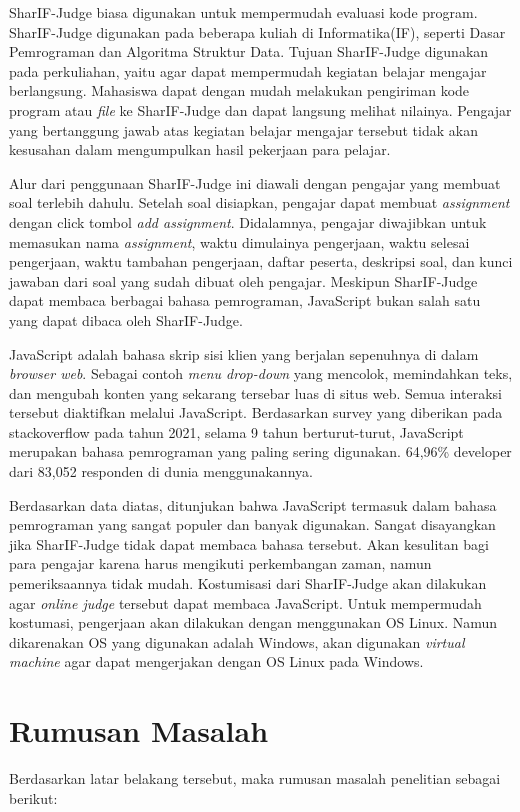 \documentclass[a4paper,twoside]{article}
\begin{document}
SharIF-Judge biasa digunakan untuk mempermudah evaluasi kode program.  SharIF-Judge digunakan pada beberapa kuliah di Informatika(IF), seperti Dasar Pemrograman dan Algoritma Struktur Data. Tujuan SharIF-Judge digunakan pada perkuliahan, yaitu agar dapat mempermudah kegiatan belajar mengajar berlangsung. Mahasiswa dapat dengan mudah melakukan pengiriman kode program atau \textit{file} ke SharIF-Judge dan dapat langsung melihat nilainya. Pengajar yang bertanggung jawab atas kegiatan belajar mengajar tersebut tidak akan kesusahan dalam mengumpulkan hasil pekerjaan para pelajar. 

Alur dari penggunaan SharIF-Judge ini diawali dengan pengajar yang membuat soal terlebih dahulu. Setelah soal disiapkan, pengajar dapat membuat \textit{assignment} dengan click tombol \textit{add assignment}. Didalamnya, pengajar diwajibkan untuk memasukan nama \textit{assignment}, waktu dimulainya pengerjaan, waktu selesai pengerjaan, waktu tambahan pengerjaan, daftar peserta, deskripsi soal, dan kunci jawaban dari soal yang sudah dibuat oleh pengajar. Meskipun SharIF-Judge dapat membaca berbagai bahasa pemrograman, JavaScript bukan salah satu yang dapat dibaca oleh SharIF-Judge.

JavaScript adalah bahasa skrip sisi klien yang berjalan sepenuhnya di dalam \textit{browser web}. Sebagai contoh \textit{menu drop-down} yang mencolok, memindahkan teks, dan mengubah konten yang sekarang tersebar luas di situs web. Semua interaksi tersebut diaktifkan melalui JavaScript. Berdasarkan survey yang diberikan pada stackoverflow pada tahun 2021, selama 9 tahun berturut-turut, JavaScript merupakan bahasa pemrograman yang paling sering digunakan. 64,96\% developer dari 83,052 responden di dunia menggunakannya.

Berdasarkan data diatas, ditunjukan bahwa JavaScript termasuk dalam bahasa pemrograman yang sangat populer dan banyak digunakan. Sangat disayangkan jika SharIF-Judge tidak dapat membaca bahasa tersebut. Akan kesulitan bagi para pengajar karena harus mengikuti perkembangan zaman, namun pemeriksaannya tidak mudah. Kostumisasi dari SharIF-Judge akan dilakukan agar \textit{online judge} tersebut dapat membaca JavaScript. Untuk mempermudah kostumasi, pengerjaan akan dilakukan dengan menggunakan OS Linux. Namun dikarenakan OS yang digunakan adalah Windows, akan digunakan \textit{virtual machine} agar dapat mengerjakan dengan OS Linux pada Windows. 

\newpage
\section{Rumusan Masalah}
Berdasarkan latar belakang tersebut, maka rumusan masalah penelitian sebagai berikut: 
\end{document}
